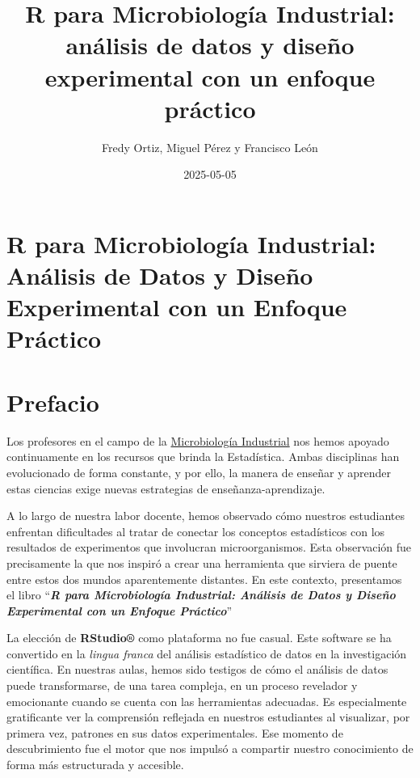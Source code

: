 \documentclass[
  letterpaper,
  DIV=11,
  numbers=noendperiod]{scrreprt}
\title{R para Microbiología Industrial: análisis de datos y diseño
experimental con un enfoque práctico}
\author{Fredy Ortiz, Miguel Pérez y Francisco León}
\date{2025-05-05}
\renewcommand*\contentsname{Table of contents}
\newcommand\contentsname{Table of contents}
\begin{document}
\maketitle

\renewcommand*\contentsname{Table of contents}
{
\hypersetup{linkcolor=}
\setcounter{tocdepth}{2}
\tableofcontents
}


\chapter{R para Microbiología Industrial: Análisis de Datos y Diseño
Experimental con un Enfoque
Práctico}\label{r-para-microbiologuxeda-industrial-anuxe1lisis-de-datos-y-diseuxf1o-experimental-con-un-enfoque-pruxe1ctico}


\chapter*{Prefacio}\label{prefacio}


Los profesores en el campo de la
\href{https://bucaramanga.udes.edu.co/estudia/pregrados/microbiologia-industrial}{Microbiología
Industrial} nos hemos apoyado continuamente en los recursos que brinda
la Estadística. Ambas disciplinas han evolucionado de forma constante, y
por ello, la manera de enseñar y aprender estas ciencias exige nuevas
estrategias de enseñanza-aprendizaje.

A lo largo de nuestra labor docente, hemos observado cómo nuestros
estudiantes enfrentan dificultades al tratar de conectar los conceptos
estadísticos con los resultados de experimentos que involucran
microorganismos. Esta observación fue precisamente la que nos inspiró a
crear una herramienta que sirviera de puente entre estos dos mundos
aparentemente distantes. En este contexto, presentamos el libro
``\textbf{\emph{R para Microbiología Industrial: Análisis de Datos y
Diseño Experimental con un Enfoque Práctico}}''

La elección de \textbf{RStudio®} como plataforma no fue casual. Este
software se ha convertido en la \emph{lingua franca} del análisis
estadístico de datos en la investigación científica. En nuestras aulas,
hemos sido testigos de cómo el análisis de datos puede transformarse, de
una tarea compleja, en un proceso revelador y emocionante cuando se
cuenta con las herramientas adecuadas. Es especialmente gratificante ver
la comprensión reflejada en nuestros estudiantes al visualizar, por
primera vez, patrones en sus datos experimentales. Ese momento de
descubrimiento fue el motor que nos impulsó a compartir nuestro
conocimiento de forma más estructurada y accesible.
\end{document}

